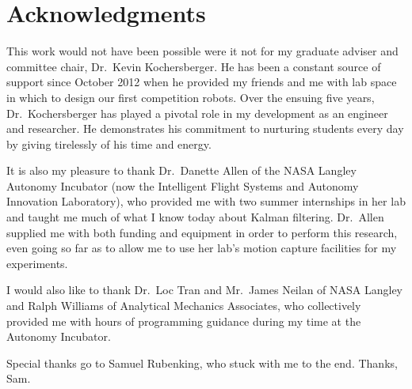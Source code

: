 \chapter*{Acknowledgments}

This work would not have been possible were it not for my graduate adviser and committee chair, Dr.~Kevin Kochersberger. He has been a constant source of support since October 2012 when he provided my friends and me with lab space in which to design our first competition robots. Over the ensuing five years, Dr.~Kochersberger has played a pivotal role in my development as an engineer and researcher. He demonstrates his commitment to nurturing students every day by giving tirelessly of his time and energy.

It is also my pleasure to thank Dr.~Danette Allen of the NASA Langley Autonomy Incubator (now the Intelligent Flight Systems and Autonomy Innovation Laboratory), who provided me with two summer internships in her lab and taught me much of what I know today about Kalman filtering. Dr.~Allen supplied me with both funding and equipment in order to perform this research, even going so far as to allow me to use her lab's motion capture facilities for my experiments.

I would also like to thank Dr.~Loc Tran and Mr.~James Neilan of NASA Langley and Ralph Williams of Analytical Mechanics Associates, who collectively provided me with hours of programming guidance during my time at the Autonomy Incubator.

Special thanks go to Samuel Rubenking, who stuck with me to the end. Thanks, Sam.